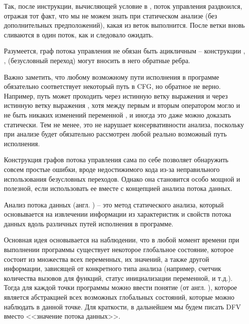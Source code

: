 Так, после инструкции, вычисляющей условие в , поток управления раздвоился, отражая тот факт, что мы не можем знать при статическом анализе (без дополнительных предположений), какая из веток выполнится. После ветки вновь сливаются в один поток, как и следовало ожидать.

Разумеется, граф потока управления не обязан быть ацикличным -- конструкции , ,  (безусловный переход) могут вносить в него обратные ребра.

Важно заметить, что любому возможному пути исполнения в программе обязательно соответствует некоторый путь в CFG, но обратное не верно. Например, путь может проходить через истинную ветку выражения \linebreak {} и через истинную ветку выражения , хотя между первым и вторым оператором могло и не быть никаких изменений переменной , и иногда это даже можно доказать статически.
Тем не менее, это не нарушает консервативности анализа, поскольку при анализе будет обязательно рассмотрен любой реально возможный путь исполнения.

Конструкция графов потока управления сама по себе позволяет обнаружить совсем простые ошибки, вроде недостижимого кода из-за неправильного использования безусловных переходов. Однако она становится особо мощной и полезной, если использовать ее вместе с концепцией анализа потока данных.

\begin{definition}
  Анализ потока данных (англ. )  -- это метод статического анализа, который основывается на извлечении информации из характеристик и свойств потока данных вдоль различных путей исполнения в программе.
\end{definition}

Основная идея основывается на наблюдении, что в любой момент времени при выполнении программы существует некоторое глобальное состояние, которое состоит из множества всех переменных, их значений, а также другой информации, зависящей от конкретного типа анализа (например, счетчик количества вызовов для функций, статус инициализации переменной, и т.д.). Тогда для каждой точки программы можно ввести понятие  (от англ. ), которое является абстракцией всех возможных глобальных состояний, которые можно наблюдать в данной точке. Для краткости, в дальнейшем мы будем писать DFV вместо <<значение потока данных>>.

